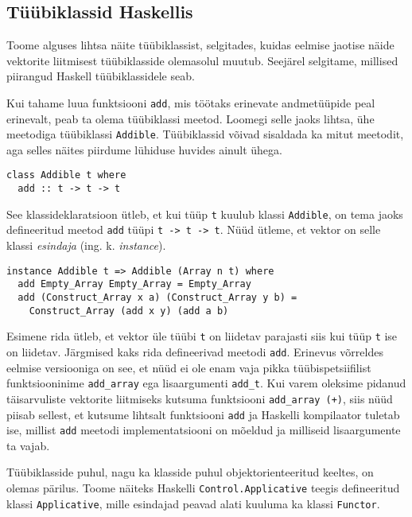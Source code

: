 \documentclass[12pt]{article}
\begin{document}
    \subsection{Tüübiklassid Haskellis}
      Toome alguses lihtsa näite tüübiklassist, selgitades, kuidas eelmise jaotise näide vektorite liitmisest tüübiklasside olemasolul muutub. Seejärel selgitame, millised piirangud Haskell tüübiklassidele seab.

      Kui tahame luua funktsiooni \verb!add!, mis töötaks erinevate andmetüüpide peal erinevalt, peab ta olema tüübiklassi meetod. Loomegi selle jaoks lihtsa, ühe meetodiga tüübiklassi \verb!Addible!. Tüübiklassid võivad sisaldada ka mitut meetodit, aga selles näites piirdume lühiduse huvides ainult ühega.

      \begin{verbatim}class Addible t where
  add :: t -> t -> t\end{verbatim}

      See klassideklaratsioon ütleb, et kui tüüp \verb!t! kuulub klassi \verb!Addible!, on tema jaoks defineeritud meetod \verb!add! tüüpi \verb!t -> t -> t!. Nüüd ütleme, et vektor on selle klassi \textit{esindaja} (ing. k. \textit{instance}).

      \begin{verbatim}instance Addible t => Addible (Array n t) where
  add Empty_Array Empty_Array = Empty_Array
  add (Construct_Array x a) (Construct_Array y b) =
    Construct_Array (add x y) (add a b)\end{verbatim}

      Esimene rida ütleb, et vektor üle tüübi \verb!t! on liidetav parajasti siis kui tüüp \verb!t! ise on liidetav. Järgmised kaks rida defineerivad meetodi \verb!add!. Erinevus võrreldes eelmise versiooniga on see, et nüüd ei ole enam vaja pikka tüübispetsiifilist funktsiooninime \verb!add_array! ega lisaargumenti \verb!add_t!. Kui varem oleksime pidanud täisarvuliste vektorite liitmiseks kutsuma funktsiooni \verb!add_array (+)!, siis nüüd piisab sellest, et kutsume lihtsalt funktsiooni \verb!add! ja Haskelli kompilaator tuletab ise, millist \verb!add! meetodi implementatsiooni on mõeldud ja milliseid lisaargumente ta vajab.

      Tüübiklasside puhul, nagu ka klasside puhul objektorienteeritud keeltes, on olemas pärilus. Toome näiteks Haskelli \verb!Control.Applicative! teegis defineeritud klassi \verb!Applicative!, mille esindajad peavad alati kuuluma ka klassi \verb!Functor!.
\end{document}
